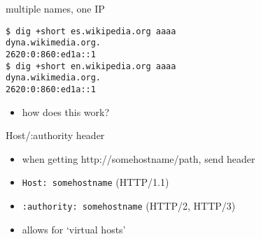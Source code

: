 \begin{frame}[fragile]{multiple names, one IP}
\begin{Verbatim}
$ dig +short es.wikipedia.org aaaa
dyna.wikimedia.org.
2620:0:860:ed1a::1
$ dig +short en.wikipedia.org aaaa
dyna.wikimedia.org.
2620:0:860:ed1a::1
\end{Verbatim}
\begin{itemize}
\item how does this work?
\end{itemize}
\end{frame}

\begin{frame}{Host/:authority header}
\begin{itemize}
\item when getting http://somehostname/path, send header
\item \texttt{Host: somehostname} (HTTP/1.1)
\item \texttt{:authority: somehostname} (HTTP/2, HTTP/3)
\vspace{.5cm}
\item allows for `virtual hosts'
\end{itemize}
\end{frame}
